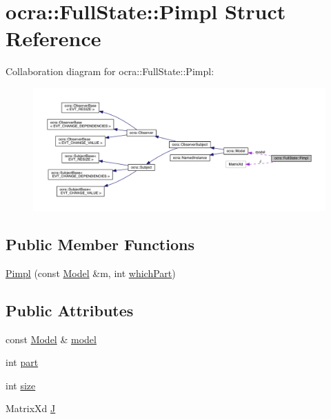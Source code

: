 \hypertarget{structocra_1_1FullState_1_1Pimpl}{}\section{ocra\+:\+:Full\+State\+:\+:Pimpl Struct Reference}
\label{structocra_1_1FullState_1_1Pimpl}


Collaboration diagram for ocra\+:\+:Full\+State\+:\+:Pimpl\+:\nopagebreak
\begin{figure}[H]
\begin{center}
\leavevmode
\includegraphics[width=350pt]{dc/d60/structocra_1_1FullState_1_1Pimpl__coll__graph}
\end{center}
\end{figure}
\subsection*{Public Member Functions}
\begin{DoxyCompactItemize}
\item 
\hyperlink{structocra_1_1FullState_1_1Pimpl_a0bede192675a41ae72485eacefca15ac}{Pimpl} (const \hyperlink{classocra_1_1Model}{Model} \&m, int \hyperlink{classocra_1_1FullState_a75ec7c039df8cb8608ebf34f7b779be5}{which\+Part})
\end{DoxyCompactItemize}
\subsection*{Public Attributes}
\begin{DoxyCompactItemize}
\item 
const \hyperlink{classocra_1_1Model}{Model} \& \hyperlink{structocra_1_1FullState_1_1Pimpl_ac8e2409d7e4a099fdb6fc3ef9c7d3026}{model}
\item 
int \hyperlink{structocra_1_1FullState_1_1Pimpl_ab10f6e199d008d84731024cb80772a5d}{part}
\item 
int \hyperlink{structocra_1_1FullState_1_1Pimpl_a5deca911251aa5b774b3cf7f3f6bd5d4}{size}
\item 
Matrix\+Xd \hyperlink{structocra_1_1FullState_1_1Pimpl_a150f47fa013614729e1e6aedf141523f}{J}
\end{DoxyCompactItemize}


